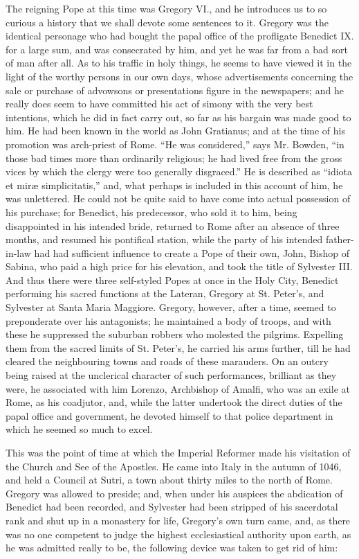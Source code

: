 The reigning Pope at this time was Gregory VI.,
and he introduces us to so curious a history that we shall devote some
sentences to it. Gregory was the identical personage who had bought
the papal office of the profligate Benedict IX. for a large sum, and
was consecrated by him, and yet he was far from a bad sort of man
after all. As to his traffic in holy things, he seems to have viewed
it in the light of the worthy persons in our own days, whose
advertisements concerning the sale or purchase of advowsons or
presentations figure in the newspapers; and he really does seem to
have committed his act of simony with the very best intentions, which
he did in fact carry out, so far as his bargain was made good to him.
He had been known in the world as John Gratianus; and at the time of
his promotion was arch-priest of Rome. ``He was considered,'' says Mr.
Bowden, ``in those bad times more than ordinarily religious; he
had lived free from the gross vices by which the clergy were too
generally disgraced.'' He is described as ``idiota et miræ
simplicitatis,'' and, what perhaps is included in this account of him,
he was unlettered. He could not be quite said to have come into actual
possession of his purchase; for Benedict, his predecessor, who sold it
to him, being disappointed in his intended bride, returned to Rome
after an absence of three months, and resumed his pontifical station,
while the party of his intended father-in-law had had sufficient
influence to create a Pope of their own, John, Bishop of Sabina, who
paid a high price for his elevation, and took the title of Sylvester
III. And thus there were three self-styled Popes at once in the Holy
City, Benedict performing his sacred functions at the Lateran, Gregory
at St. Peter's, and Sylvester at Santa Maria Maggiore. Gregory,
however, after a time, seemed to preponderate over his antagonists; he
maintained a body of troops, and with these he suppressed the suburban
robbers who molested the pilgrims. Expelling them from the sacred
limits of St. Peter's, he carried his arms further, till he had
cleared the neighbouring towns and roads of these marauders. On an
outcry being raised at the unclerical character of such performances,
brilliant as they were, he associated with him Lorenzo, Archbishop of
Amalfi, who was an exile at Rome, as his coadjutor, and, while the
latter undertook the direct duties of the papal office and government,
he devoted himself to that police department in which he seemed so
much to excel.

This was the point of time at which the Imperial
Reformer made his visitation of the Church and See of the Apostles. He
came into Italy in the autumn of 1046, and held a Council at Sutri, a
town about thirty miles to the north of Rome. Gregory was
allowed to preside; and, when under his auspices the abdication of
Benedict had been recorded, and Sylvester had been stripped of his
sacerdotal rank and shut up in a monastery for life, Gregory's own
turn came, and, as there was no one competent to judge the highest
ecclesiastical authority upon earth, as he was admitted really to be,
the following device was taken to get rid of him:


